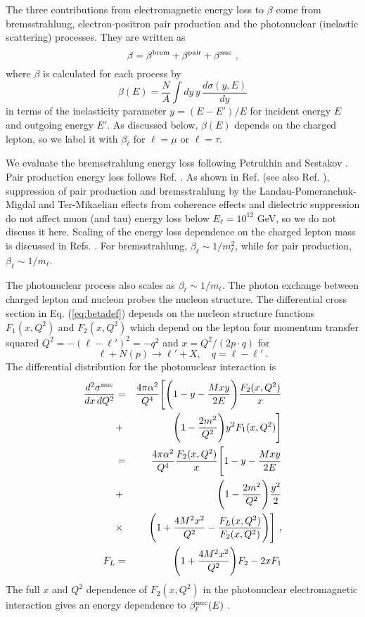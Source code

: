 \documentclass[aps,10pt,twocolumn,tightenlines]{revtex4-1}
\begin{document}
The three contributions from electromagnetic energy loss to $\beta$ come from bremsstrahlung, electron-positron pair production
and the photonuclear (inelastic scattering) processes. They are written as
\begin{equation}
\beta = \beta^{\rm brem}+\beta^{\rm pair} + \beta^{\rm nuc}\ ,
\end{equation}
where $\beta$ is calculated for each process by
\begin{equation}
\label{eq:betadef}
\beta(E) = \frac{N}{A}\int dy\, y\, \frac{d\sigma(y,E)}{dy}
\end{equation}
in terms of the inelasticity parameter $y = (E-E')/E$ for incident energy $E$ and outgoing energy $E'$.
As discussed below, $\beta(E)$ depends on the charged lepton, so we label it with $\beta_\ell$ for $\ell=\mu$ or
$\ell=\tau$.

We evaluate the bremsstrahlung energy loss following Petrukhin and Sestakov \cite{pesh:1968}. 
Pair production energy loss follows Ref. \cite{kp}. As shown in Ref. \cite{Koehne:2013gpa} (see also Ref. \cite{Klein:1998du}), suppression of pair production and bremsstrahlung by the Landau-Pomeranchuk-Migdal and Ter-Mikaelian effects from coherence effects and dielectric suppression do not affect muon (and tau) energy loss below $E_\ell =10^{12}$ GeV, so we do not discuss it here. 
Scaling of the energy loss dependence on the charged lepton mass is
discussed in Refs. \cite{Tannenbaum:1990ae,Reno:2005si}. For bremsstrahlung, $\beta_\ell \sim 1/m_\ell^2$, while
for pair production, $\beta_\ell\sim 1/m_\ell$.

The photonuclear process also scales as $\beta_\ell \sim 1/m_\ell$. The photon exchange between charged lepton and nucleon probes the nucleon structure.
The differential cross section in 
Eq. (\ref{eq:betadef}) depends on the nucleon structure functions $F_1(x,Q^2)$ and $F_2(x,Q^2)$ which depend on the 
lepton four momentum transfer squared $Q^2=-(\ell - \ell ')^2=-q^2$ and $x=Q^2/(2 p\cdot q)$ for
\begin{equation}
\ell + N(p) \to \ell' +X,\quad q=\ell - \ell'\ .
\end{equation}
The differential distribution for the photonuclear interaction is
\begin{eqnarray} 
\nonumber
\frac{d^2\sigma^{\rm nuc}}{dx\, dQ^2} &=& \frac{4\pi \alpha^2}{Q^4}
\Biggl[\Biggl(1-y-\frac{Mxy}{2E}\Biggr) \frac{F_2(x,Q^2)}{x}\\
\nonumber
&+&\Biggl( 1-\frac{2m^2}{Q^2}\Biggr) y^2 F_1(x,Q^2)
\Biggr]\\
\nonumber
&=& \frac{4\pi \alpha^2}{Q^4}\frac{F_2(x,Q^2)}{x}
\Biggl[ 1-y-\frac{Mxy}{2E}\\
\nonumber
&+& \Biggl( 1-\frac{2m^2}{Q^2}\Biggr) \frac{y^2}{2}\\
&\times & \Biggl(
1+\frac{4M^2x^2}{Q^2}-\frac{F_L(x,Q^2)}{F_2(x,Q^2)}\Biggr)
\Biggr] \ ,\\
F_L &=& \Biggl(1+\frac{4 M^2 x^2}{Q^2}\Biggr) F_2 - 2 x F_1
\end{eqnarray}
The full $x$ and $Q^2$ dependence of $F_2(x,Q^2)$ in the photonuclear electromagnetic interaction gives an energy dependence to $\beta_\ell^{\rm nuc}(E)$ \cite{Dutta:2000hh}. 
\end{document}
